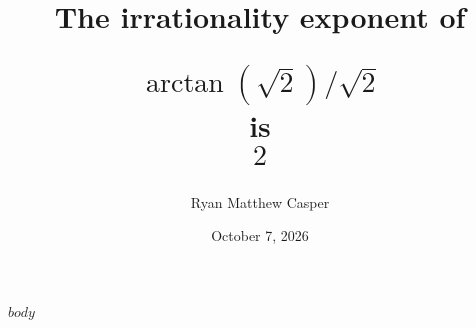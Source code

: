 \documentclass[11pt]{article}
\title{The irrationality exponent of\par $$\arctan(\sqrt{2})/\sqrt{2}$$ is $$2$$}
\author{Ryan Matthew Casper}
\date{October 7, 2026}
\begin{document}
\maketitle
$body$
\end{document}
